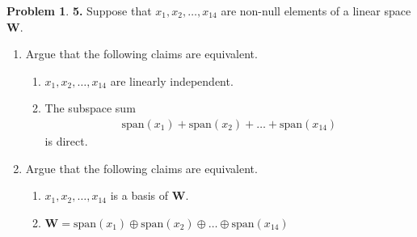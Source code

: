 \documentclass{article}
\theoremstyle{definition}
\newtheorem*{prob*}{Problem}
\newcommand{\W}{\mathbf{W}}
\newcommand{\xpan}{\text{span}}
\begin{document}
\newpage




\begin{prob*} \textbf{5.} Suppose that $x_1, x_2,\dots,x_{14}$ are non-null elements of a linear space $\W$. 
	\begin{enumerate}
		\item Argue that the following claims are equivalent. 
		\begin{enumerate}
			\item $x_1, x_2,\dots,x_{14}$ are linearly independent. 
			\item The subspace sum 
			\begin{align*}
			\xpan(x_1) + \xpan(x_2) + \dots + \xpan(x_{14})
			\end{align*}
			is direct. 
		\end{enumerate}
		\item Argue that the following claims are equivalent.
		\begin{enumerate}
			\item $x_1, x_2,\dots,x_{14}$  is a basis of $\W$.
			\item $\W = \xpan(x_1) \oplus \xpan(x_2) \oplus \dots \oplus \xpan(x_{14})$
		\end{enumerate}
	\end{enumerate}


\end{prob*}


\newpage
\end{document}
